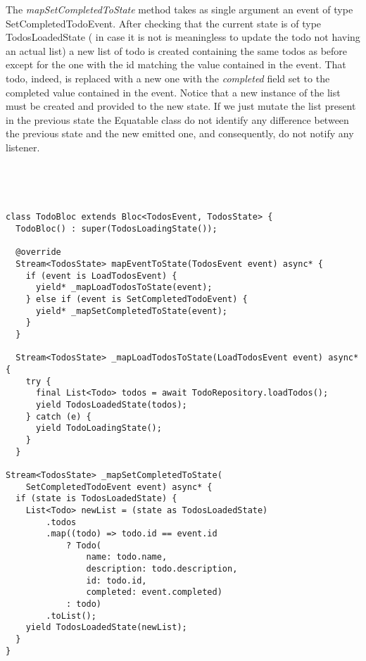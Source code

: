 The \textit{mapSetCompletedToState} method takes as single argument an event of type SetCompletedTodoEvent. After checking that the current state is of type TodosLoadedState ( in case it is not is meaningless to update the todo not having an actual list) a new list of todo is created containing the same todos as before except for the one with the id matching the value contained in the event. That todo, indeed, is replaced with a new one with the \textit{completed} field set to the completed value contained in the event. Notice that a new instance of the list must be created and provided to the new state. If we just mutate the list present in the previous state the Equatable class do not identify any difference between the previous state and the new emitted one, and consequently, do not notify any listener. 
\begin{code}
\mbox{}\\
 \mbox{}
\label{code:2.14}
\begin{verbatim}


class TodoBloc extends Bloc<TodosEvent, TodosState> {
  TodoBloc() : super(TodosLoadingState());

  @override
  Stream<TodosState> mapEventToState(TodosEvent event) async* {
    if (event is LoadTodosEvent) {
      yield* _mapLoadTodosToState(event);
    } else if (event is SetCompletedTodoEvent) {
      yield* _mapSetCompletedToState(event);
    } 
  }

  Stream<TodosState> _mapLoadTodosToState(LoadTodosEvent event) async* {
    try {
      final List<Todo> todos = await TodoRepository.loadTodos();
      yield TodosLoadedState(todos);
    } catch (e) {
      yield TodoLoadingState();
    }
  }

Stream<TodosState> _mapSetCompletedToState(
    SetCompletedTodoEvent event) async* {
  if (state is TodosLoadedState) {
    List<Todo> newList = (state as TodosLoadedState)
        .todos
        .map((todo) => todo.id == event.id
            ? Todo(
                name: todo.name,
                description: todo.description,
                id: todo.id,
                completed: event.completed)
            : todo)
        .toList();
    yield TodosLoadedState(newList);
  }
}


\end{verbatim}
\mbox{}
\end{code}
